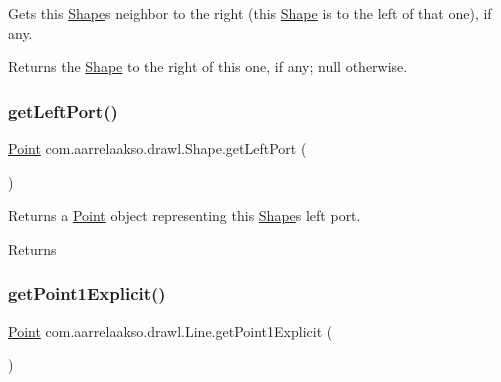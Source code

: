 Gets this \hyperlink{classcom_1_1aarrelaakso_1_1drawl_1_1_shape}{Shape}\textquotesingle{}s neighbor to the right (this \hyperlink{classcom_1_1aarrelaakso_1_1drawl_1_1_shape}{Shape} is to the left of that one), if any. 

\begin{DoxyReturn}{Returns}
the \hyperlink{classcom_1_1aarrelaakso_1_1drawl_1_1_shape}{Shape} to the right of this one, if any; {\ttfamily null} otherwise. 
\end{DoxyReturn}
\mbox{\label{classcom_1_1aarrelaakso_1_1drawl_1_1_shape_aeffa96786ca552adf46924ec77da9555}} 
\subsubsection{\texorpdfstring{get\+Left\+Port()}{getLeftPort()}}
{\footnotesize\ttfamily \hyperlink{classcom_1_1aarrelaakso_1_1drawl_1_1_point}{Point} com.\+aarrelaakso.\+drawl.\+Shape.\+get\+Left\+Port (\begin{DoxyParamCaption}{ }\end{DoxyParamCaption})\hspace{0.3cm}{\ttfamily [inherited]}}



Returns a \hyperlink{classcom_1_1aarrelaakso_1_1drawl_1_1_point}{Point} object representing this \hyperlink{classcom_1_1aarrelaakso_1_1drawl_1_1_shape}{Shape}\textquotesingle{}s left port. 

\begin{DoxyReturn}{Returns}

\end{DoxyReturn}
\mbox{\label{classcom_1_1aarrelaakso_1_1drawl_1_1_line_ac8344112f3a5d24cfa4b732f3625af08}} 
\subsubsection{\texorpdfstring{get\+Point1\+Explicit()}{getPoint1Explicit()}}
{\footnotesize\ttfamily \hyperlink{classcom_1_1aarrelaakso_1_1drawl_1_1_point}{Point} com.\+aarrelaakso.\+drawl.\+Line.\+get\+Point1\+Explicit (\begin{DoxyParamCaption}{ }\end{DoxyParamCaption})\hspace{0.3cm}{\ttfamily [protected]}}

